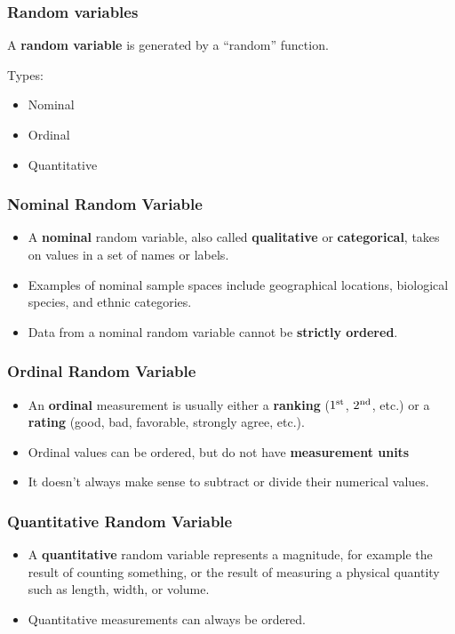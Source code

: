 \begin{frame} \frametitle{Random variables}
A {\bf random variable} is generated by a ``random'' function. 

Types:
\begin{itemize}
\item Nominal
\item Ordinal
\item Quantitative
\end{itemize}
\end{frame}


\begin{frame}\frametitle{Nominal Random Variable}
\begin{itemize}
\item A {\bf nominal} random variable, also called {\bf qualitative} or {\bf  categorical}, takes on values in a set of names or labels.
\item Examples of nominal sample spaces include geographical locations, biological species, and ethnic categories.
\item Data from a nominal random variable cannot be {\bf strictly ordered}.
\end{itemize}
\end{frame}

\begin{frame}\frametitle{Ordinal Random Variable}

\begin{itemize}
\item An {\bf ordinal} measurement is usually either a {\bf ranking}
($1^{\rm st}$, $2^{\rm nd}$, etc.) or a {\bf rating} (good, bad,
favorable, strongly agree, etc.).  

\item Ordinal values can be ordered, but do not have {\bf measurement units}
\item It doesn't always make sense to subtract or divide their numerical
values.
\end{itemize}
\end{frame}

\begin{frame}\frametitle{Quantitative Random Variable}

\begin{itemize}
\item A {\bf quantitative} random variable represents a magnitude, for
example the result of counting something, or the result of measuring a
physical quantity such as length, width, or volume.

\item Quantitative measurements can always be ordered.
\end{itemize}
\end{frame}

